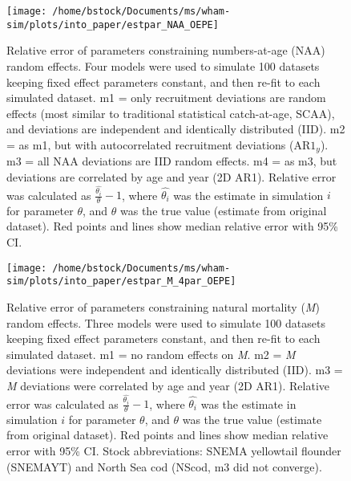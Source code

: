 \documentclass[]{article}
\begin{document}
\pagebreak

\begin{figure}

{\centering \texttt{[image: /home/bstock/Documents/ms/wham-sim/plots/into\_paper/estpar\_NAA\_OEPE]} 

}

\caption{Relative error of parameters constraining numbers-at-age (NAA) random effects. Four models were used to simulate 100 datasets keeping fixed effect parameters constant, and then re-fit to each simulated dataset. m1 = only recruitment deviations are random effects (most similar to traditional statistical catch-at-age, SCAA), and deviations are independent and identically distributed (IID). m2 = as m1, but with autocorrelated recruitment deviations ($\text{AR1}_y$). m3 = all NAA deviations are IID random effects. m4 = as m3, but deviations are correlated by age and year (2D AR1). Relative error was calculated as $\frac{\hat{\theta_i}}{\theta} - 1$, where $\hat{\theta_i}$ was the estimate in simulation $i$ for parameter $\theta$, and $\theta$ was the true value (estimate from original dataset). Red points and lines show median relative error with 95\% CI.}\label{fig:estpar-naa}
\end{figure}

\pagebreak

\begin{figure}

{\centering \texttt{[image: /home/bstock/Documents/ms/wham-sim/plots/into\_paper/estpar\_M\_4par\_OEPE]} 

}

\caption{Relative error of parameters constraining natural mortality (\textit{M}) random effects. Three models were used to simulate 100 datasets keeping fixed effect parameters constant, and then re-fit to each simulated dataset. m1 = no random effects on \textit{M}. m2 = \textit{M} deviations were independent and identically distributed (IID). m3 = \textit{M} deviations were correlated by age and year (2D AR1). Relative error was calculated as $\frac{\hat{\theta_i}}{\theta} - 1$, where $\hat{\theta_i}$ was the estimate in simulation $i$ for parameter $\theta$, and $\theta$ was the true value (estimate from original dataset). Red points and lines show median relative error with 95\% CI. Stock abbreviations: SNEMA yellowtail flounder (SNEMAYT) and North Sea cod (NScod, m3 did not converge).}\label{fig:estpar-m}
\end{figure}

\pagebreak
\end{document}
